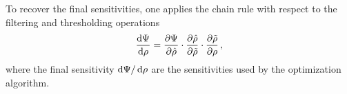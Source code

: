  To recover the final sensitivities, one applies the chain rule with respect to the filtering and thresholding operations
    \begin{equation}
 \frac{\mathop{}\!\text{d} \Psi}{\mathop{}\!\text{d} \rho} = \frac{\partial \Psi}{\partial \hat{\rho}} \cdot \frac{\partial \hat{\rho}}{\partial \tilde{\rho}} \cdot \frac{\partial \tilde{\rho}}{\partial \rho}\,,
    \end{equation}
 where the final sensitivity $\mathop{}\!\text{d} \Psi/\mathop{}\!\text{d} \rho$ are the sensitivities used by the optimization algorithm.



